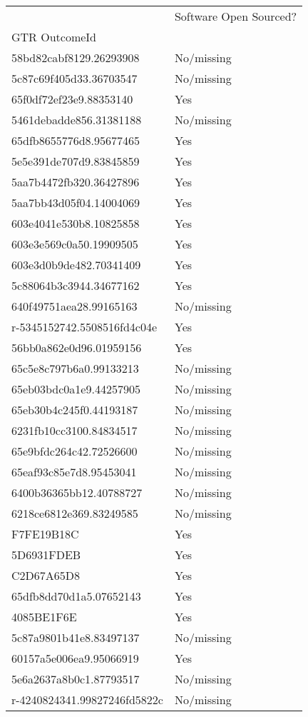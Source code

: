 \begin{tabular}{ll}
\toprule
 & Software Open Sourced? \\
GTR OutcomeId &  \\
\midrule
58bd82cabf8129.26293908 & No/missing \\
5c87c69f405d33.36703547 & No/missing \\
65f0df72ef23e9.88353140 & Yes \\
5461debadde856.31381188 & No/missing \\
65dfb8655776d8.95677465 & Yes \\
5e5e391de707d9.83845859 & Yes \\
5aa7b4472fb320.36427896 & Yes \\
5aa7bb43d05f04.14004069 & Yes \\
603e4041e530b8.10825858 & Yes \\
603e3e569c0a50.19909505 & Yes \\
603e3d0b9de482.70341409 & Yes \\
5c88064b3c3944.34677162 & Yes \\
640f49751aea28.99165163 & No/missing \\
r-5345152742.5508516fd4c04e & Yes \\
56bb0a862e0d96.01959156 & Yes \\
65c5e8c797b6a0.99133213 & No/missing \\
65eb03bdc0a1e9.44257905 & No/missing \\
65eb30b4c245f0.44193187 & No/missing \\
6231fb10cc3100.84834517 & No/missing \\
65e9bfdc264c42.72526600 & No/missing \\
65eaf93c85e7d8.95453041 & No/missing \\
6400b36365bb12.40788727 & No/missing \\
6218ce6812e369.83249585 & No/missing \\
F7FE19B18C & Yes \\
5D6931FDEB & Yes \\
C2D67A65D8 & Yes \\
65dfb8dd70d1a5.07652143 & Yes \\
4085BE1F6E & Yes \\
5c87a9801b41e8.83497137 & No/missing \\
60157a5e006ea9.95066919 & Yes \\
5e6a2637a8b0c1.87793517 & No/missing \\
r-4240824341.99827246fd5822c & No/missing \\

\end{tabular}
